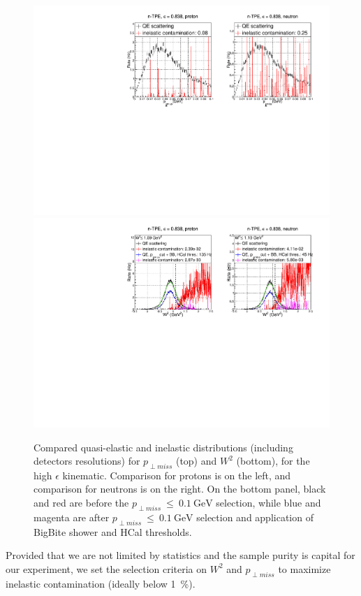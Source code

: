 \begin{figure}[!h]
  \begin{center}
    \includegraphics[width=12cm]{Plots/gen-tpe_he_pperp_acc.pdf}
    \includegraphics[width=12cm]{Plots/gen-tpe_he_W2_acc.pdf}
    \caption{Compared quasi-elastic and inelastic distributions (including detectors resolutions) for $p_{\perp miss}$ (top) and $W^2$ (bottom), for the high $\epsilon$ kinematic. Comparison for protons is on the left, and comparison for neutrons is on the right. On the bottom panel, black and red are before the $p_{\perp miss}~\leq~0.1~\mathrm{GeV}$ selection, while blue and magenta are after $p_{\perp miss}~\leq~0.1~\mathrm{GeV}$ selection and application of BigBite shower and HCal thresholds.}
    \label{fig:inel_contam_he}
  \end{center}
\end{figure}
%
Provided that we are not limited by statistics and the sample purity is capital for our experiment, we set the selection criteria on $W^2$ and $p_{\perp miss}$ to maximize inelastic contamination (ideally below 1~\%). 
